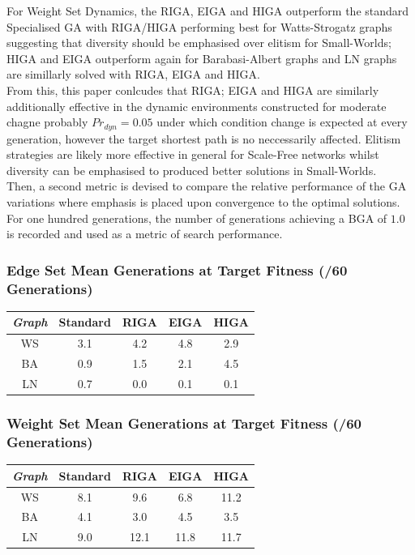 \documentclass[
	a4paper, %
	10pt, %
	unnumberedsections, %
	twoside, %
]{LTJournalArticle}
\begin{document}
For Weight Set Dynamics, the RIGA, EIGA and HIGA outperform the standard Specialised GA with RIGA/HIGA performing best for Watts-Strogatz graphs suggesting that diversity should be emphasised over elitism for Small-Worlds; HIGA and EIGA outperform again for Barabasi-Albert graphs and LN graphs are simillarly solved with RIGA, EIGA and HIGA.  \\

From this, this paper conlcudes that RIGA; EIGA and HIGA are similarly additionally  effective in the dynamic environments constructed for moderate chagne probably \(Pr_{dyn} = 0.05\) under which condition change is expected at every generation, however the target shortest path is no neccessarily affected. Elitism strategies are likely more effective in general for Scale-Free networks whilst diversity can be emphasised to produced better solutions in Small-Worlds. \\ 

Then, a second metric is devised to compare the relative performance of the GA variations where emphasis is placed upon convergence to the optimal solutions. For one hundred generations, the number of generations achieving a BGA of \(1.0\) is recorded and used as a metric of search performance. 

\subsubsection{Edge Set Mean Generations at Target Fitness (/60 Generations)}
\begin{center}
\begin{tabular}{||c c c c c||} 
 \hline
 \emph{Graph} & Standard & RIGA & EIGA & HIGA \\ [0.5ex] 
 \hline\hline
 WS & 3.1 & 4.2 & 4.8 & 2.9 \\ 
 \hline
 BA & 0.9 & 1.5 & 2.1 & 4.5 \\
 \hline
 LN & 0.7 & 0.0 & 0.1 & 0.1 \\
\end{tabular}
\end{center}

\subsubsection{Weight Set Mean Generations at Target Fitness (/60 Generations)} 

\begin{center}
\begin{tabular}{||c c c c c||} 
 \hline
 \emph{Graph} & Standard & RIGA & EIGA & HIGA \\ [0.5ex] 
 \hline\hline
 WS & 8.1 & 9.6 & 6.8 & 11.2 \\ 
 \hline
 BA & 4.1 & 3.0 & 4.5 & 3.5 \\
 \hline
 LN & 9.0 & 12.1 & 11.8 & 11.7 \\
\end{tabular}
\end{center}
\end{document}
